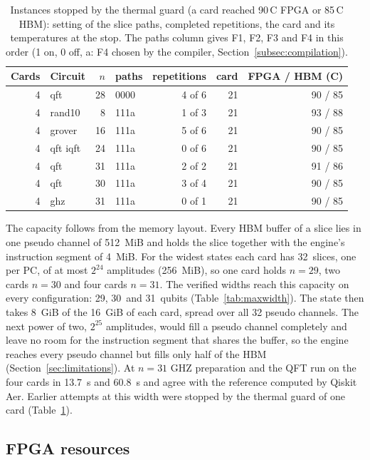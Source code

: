 \documentclass[pdflatex,sn-mathphys-num]{sn-jnl}
\newcommand{\NumMaxThirtyOneGhzS}{13.7}
\newcommand{\NumMaxThirtyOneQftS}{60.8}
\newcommand{\NumMaxWidthFourCards}{31}
\newcommand{\NumMaxWidthOneCard}{29}
\newcommand{\NumMaxWidthTwoCards}{30}
\newcommand{\NumPcsUsedFlagship}{32}
\theoremstyle{thmstyleone}
\theoremstyle{thmstylethree}
\begin{document}
\begin{table}[t]
\caption{Instances stopped by the thermal guard (a card reached 90\,\textdegree C FPGA or 85\,\textdegree C HBM): setting of
the slice paths, completed repetitions, the card and its temperatures at the stop. The paths column gives F1, F2, F3 and
F4 in this order (1 on, 0 off, a: F4 chosen by the compiler, Section~\ref{subsec:compilation}).}\label{tab:thermal}
\begin{tabular}{@{}rlrlrrr@{}}
\toprule
Cards & Circuit & $n$ & paths & repetitions & card & FPGA / HBM (C) \\
\midrule
4 & qft & 28 & 0000 & 4 of 6 & 21 & 90 / 85 \\
4 & rand10 & 8 & 111a & 1 of 3 & 21 & 93 / 88 \\
4 & grover & 16 & 111a & 5 of 6 & 21 & 90 / 85 \\
4 & qft iqft & 24 & 111a & 0 of 6 & 21 & 90 / 85 \\
4 & qft & 31 & 111a & 2 of 2 & 21 & 91 / 86 \\
4 & qft & 30 & 111a & 3 of 4 & 21 & 90 / 85 \\
4 & ghz & 31 & 111a & 0 of 1 & 21 & 90 / 85 \\
\bottomrule
\end{tabular}
\end{table}

The capacity follows from the memory layout. Every HBM buffer of a slice lies in one pseudo channel of 512~MiB and
holds the slice together with the engine's instruction segment of 4~MiB. For the widest states each card has
\NumPcsUsedFlagship~slices, one per PC, of at most $2^{24}$ amplitudes (256~MiB), so one card holds $n=29$, two cards
$n=30$ and four cards $n=31$. The verified widths reach this capacity on every configuration: \NumMaxWidthOneCard,
\NumMaxWidthTwoCards~and \NumMaxWidthFourCards~qubits (Table~\ref{tab:maxwidth}). The state then takes 8~GiB of the
16~GiB of each card, spread over all 32 pseudo channels. The next power of two, $2^{25}$ amplitudes, would fill a pseudo
channel completely and leave no room for the instruction segment that shares the buffer, so the engine reaches every
pseudo channel but fills only half of the HBM (Section~\ref{sec:limitations}). At $n=31$ GHZ
preparation and the QFT run on the four cards in \NumMaxThirtyOneGhzS~s and \NumMaxThirtyOneQftS~s and agree with the
reference computed by Qiskit Aer. Earlier attempts at this width were stopped by the thermal guard of one card
(Table~\ref{tab:thermal}).

\subsection{FPGA resources}\label{subsec:res-resources}
\end{document}
